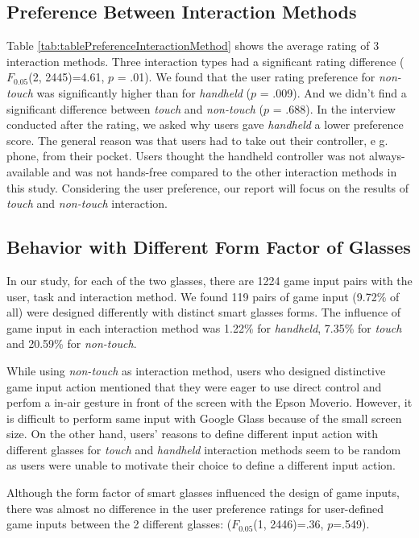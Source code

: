 \documentclass{sigchi}
\begin{document}
  \subsection{Preference Between Interaction Methods}
  Table \ref{tab:tablePreferenceInteractionMethod} shows the average rating of 3 interaction methods. Three interaction types had a significant rating difference ($F_{0.05}$(2, 2445)=4.61, $p$ = .01). We found that the user rating preference for \emph{non-touch} was significantly higher than for \emph{handheld} ($p$ = .009). And we didn't find a significant difference between \emph{touch} and \emph{non-touch} ($p$ = .688).
  In the interview conducted after the rating, we asked why users gave \emph{handheld} a lower preference score.
  The general reason was that users had to take out their controller, e g. phone, from their pocket. Users thought the handheld controller was not always-available and was not hands-free compared to the other interaction methods in this study. Considering the user preference, our report will focus on the results of \emph{touch} and \emph{non-touch} interaction.



  \subsection{Behavior with Different Form Factor of Glasses}
  In our study, for each of the two glasses, there are 1224 game input pairs with the user, task and interaction method. We found 119 pairs of game input (9.72\% of all) were designed differently with distinct smart glasses forms. The influence of game input in each interaction method was 1.22\% for \emph{handheld}, 7.35\% for \emph{touch} and 20.59\% for \emph{non-touch}.

  While using \emph{non-touch} as interaction method, users who designed distinctive game input action mentioned that they were eager to use direct control and perfom a in-air gesture in front of the screen with the Epson Moverio. However, it is difficult to perform same input with Google Glass because of the small screen size. On the other hand, users' reasons to define different input action with different glasses for \emph{touch} and \emph{handheld} interaction methods seem to be random as users were unable to motivate their choice to define a different input action.

  Although the form factor of smart glasses influenced the design of game inputs, there was almost no difference in the user preference ratings for user-defined game inputs between the 2 different glasses: ($F_{0.05}$(1, 2446)=.36, $p$=.549).
\end{document}
